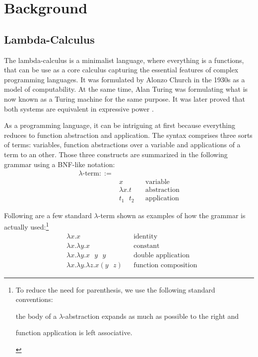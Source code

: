 \section{Background}
\label{sec:background}

\subsection{Lambda-Calculus}
\label{sec:background-lambda-calculus}

The lambda-calculus is a minimalist language, where everything is a functions, that can be use as a
core calculus capturing the essential features of complex programming languages. It was formulated
by Alonzo Church \cite{???} in the 1930s as a model of computability. At the same time, Alan Turing
was formulating what is now known as a Turing machine \cite{???} for the same purpose. It was later
proved that both systems are equivalent in expressive power \cite{???}.

As a programming language, it can be intriguing at first because everything reduces to function
abstraction and application. The syntax comprises three sorts of terms: variables, function
abstractions over a variable and applications of a term to an other. Those three constructs are
summarized in the following grammar using a BNF-like notation:
\begin{align*}
  \lambda\text{-term} ::= & \\
    & x && \text{variable} \\
    & \lambda x. t && \text{abstraction} \\
    & t_1 \text{ } t_2 && \text{application}
\end{align*}

Following are a few standard $\lambda$-term shown as examples of how the grammar is actually
used:\footnote{To reduce the need for parenthesis, we use the following standard conventions:
\begin{enumerate*}[label=(\arabic*)]
  \item the body of a $\lambda$-abstraction expands as much as possible to the right and
  \item function application is left associative.
\end{enumerate*}}
\begin{align*}
  & \lambda x. x && \text{identity} \\
  & \lambda x. \lambda y. x && \text{constant} \\
  & \lambda x. \lambda y. x \text{ } y \text{ } y && \text{double application} \\
  & \lambda x. \lambda y. \lambda z. x (y \text{ } z) && \text{function composition}
\end{align*}

